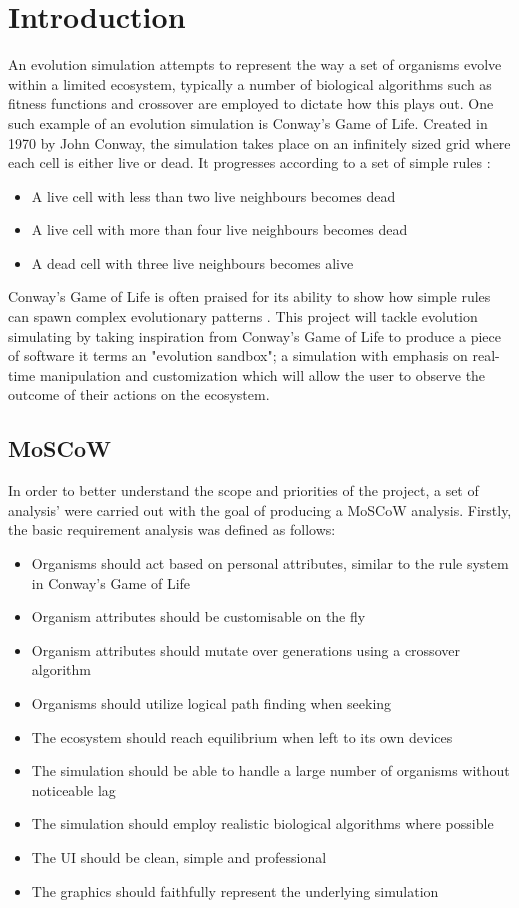 \documentclass[a4paper, oneside, 11pt]{report}
\begin{document}
\chapter{Introduction}
An evolution simulation attempts to represent the way a set of organisms evolve within a limited ecosystem, typically a number of biological algorithms such as fitness functions and crossover are employed to dictate how this plays out. One such example of an evolution simulation is Conway's Game of Life. Created in 1970 by John Conway, the simulation takes place on an infinitely sized grid where each cell is either live or dead. It progresses according to a set of simple rules \cite{guardian}:
\begin{itemize}
	\item A live cell with less than two live neighbours becomes dead
	\item A live cell with more than four live neighbours becomes dead
	\item A dead cell with three live neighbours becomes alive
\end{itemize}

Conway's Game of Life is often praised for its ability to show how simple rules can spawn complex evolutionary patterns \cite{callahan}. This project will tackle evolution simulating by taking inspiration from Conway's Game of Life to produce a piece of software it terms an "evolution sandbox"; a simulation with emphasis on real-time manipulation and customization which will allow the user to observe the outcome of their actions on the ecosystem.

\section{MoSCoW}
In order to better understand the scope and priorities of the project, a set of analysis' were carried out with the goal of producing a MoSCoW analysis.
\smallskip 
Firstly, the basic requirement analysis was defined as follows:
\begin{itemize}\label{requirements}
	\item Organisms should act based on personal attributes, similar to the rule system in Conway's Game of Life
	\item Organism attributes should be customisable on the fly
	\item Organism attributes should mutate over generations using a crossover algorithm
	\item Organisms should utilize logical path finding when seeking
	\item The ecosystem should reach equilibrium when left to its own devices
	\item The simulation should be able to handle a large number of organisms without noticeable lag
	\item The simulation should employ realistic biological algorithms where possible
	\item The UI should be clean, simple and professional
	\item The graphics should faithfully represent the underlying simulation
\end{itemize}
\smallskip 
\end{document}
